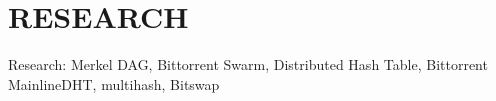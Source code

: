 \documentclass[a4paper,11pt, oneside]{report}
\theoremstyle{definition}
\begin{document}
\printglossaries

\listoffigures
\chapter{RESEARCH}
Research: Merkel DAG, Bittorrent Swarm, Distributed Hash Table, Bittorrent MainlineDHT, multihash, Bitswap
\end{document}
